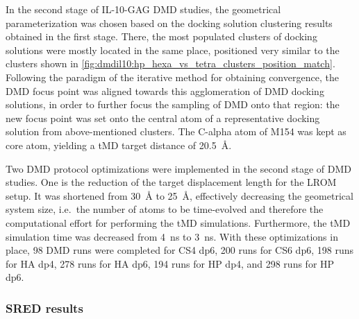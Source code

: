 In the second stage of IL-10-GAG DMD studies, the geometrical parameterization
was chosen based on the docking solution clustering results obtained in the
first stage. There, the most populated clusters of docking solutions were mostly
located in the same place, positioned very similar to the clusters shown in
\cref{fig:dmdil10:hp_hexa_vs_tetra_clusters_position_match}.  Following the
paradigm of the iterative method for obtaining convergence, the DMD focus point
was aligned towards this agglomeration of DMD docking solutions, in order to
further focus the sampling of DMD onto that region: the new focus point was set
onto the central atom of a representative docking solution from above-mentioned
clusters. The C-alpha atom of M154 was kept as core atom, yielding a tMD target
distance of \SI{20.5}{\angstrom}.

Two DMD protocol optimizations were implemented in the second stage of DMD
studies. One is the reduction of the target displacement length for the LROM
setup. It was shortened from \SI{30}{\angstrom} to \SI{25}{\angstrom},
effectively decreasing the geometrical system size, i.e.\ the number of atoms to
be time-evolved and therefore the computational effort for performing the tMD
simulations. Furthermore, the tMD simulation time was decreased from
\SI{4}{\nano\second} to \SI{3}{\nano\second}. With these optimizations in place,
98 DMD runs were completed for CS4 dp6, 200 runs for CS6 dp6, 198 runs for HA
dp4, 278 runs for HA dp6, 194 runs for HP dp4, and 298 runs for HP dp6.


\subsubsection{SRED results}



